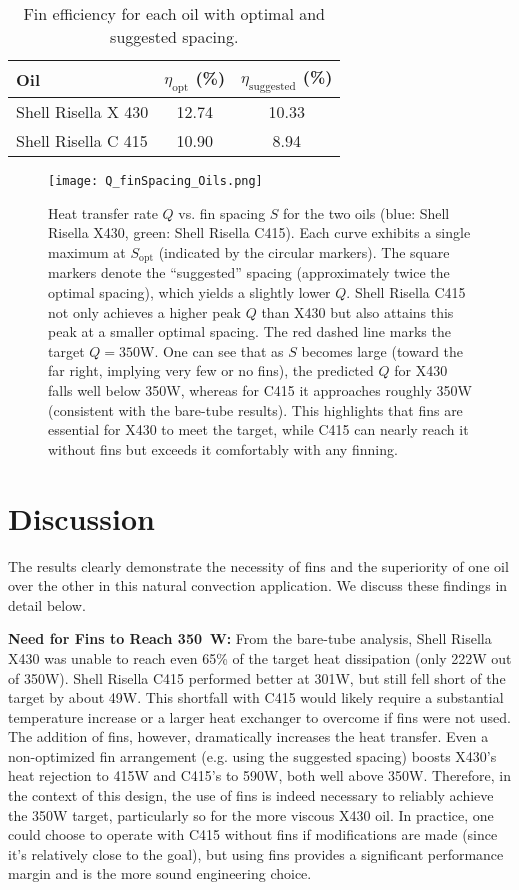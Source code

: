 \documentclass[12pt]{article}
\begin{document}
\begin{table}[h!]
\centering
\caption{Fin efficiency for each oil with optimal and suggested spacing.}
\label{tab:eta}
\begin{tabular}{lcc}
\toprule
Oil & $\eta_{\text{opt}}$ (\%) & $\eta_{\text{suggested}}$ (\%) \\
\midrule
Shell Risella X 430 & 12.74 & 10.33 \\
Shell Risella C 415 & 10.90 & 8.94 \\
\bottomrule
\end{tabular}
\end{table}
\begin{figure}[h!]    \centering
    \texttt{[image: Q\_finSpacing\_Oils.png]}
\caption{Heat transfer rate $Q$ vs. fin spacing $S$ for the two oils (blue: Shell Risella X430, green: Shell Risella C415). Each curve exhibits a single maximum at $S_{\text{opt}}$ (indicated by the circular markers). The square markers denote the “suggested” spacing (approximately twice the optimal spacing), which yields a slightly lower $Q$. Shell Risella C415 not only achieves a higher peak $Q$ than X430 but also attains this peak at a smaller optimal spacing. The red dashed line marks the target $Q=350$W. One can see that as $S$ becomes large (toward the far right, implying very few or no fins), the predicted $Q$ for X430 falls well below 350W, whereas for C415 it approaches roughly 350W (consistent with the bare-tube results). This highlights that fins are essential for X430 to meet the target, while C415 can nearly reach it without fins but exceeds it comfortably with any finning.}
\label{fig:heat_transfer}
\end{figure}

\section{Discussion}
The results clearly demonstrate the necessity of fins and the superiority of one oil over the other in this natural convection application. We discuss these findings in detail below.

\textbf{Need for Fins to Reach 350~W:} From the bare-tube analysis, Shell Risella X430 was unable to reach even 65\% of the target heat dissipation (only 222W out of 350W). Shell Risella C415 performed better at 301W, but still fell short of the target by about 49W. This shortfall with C415 would likely require a substantial temperature increase or a larger heat exchanger to overcome if fins were not used. The addition of fins, however, dramatically increases the heat transfer. Even a non-optimized fin arrangement (e.g. using the suggested spacing) boosts X430’s heat rejection to 415W and C415’s to 590W, both well above 350W. Therefore, in the context of this design, the use of fins is indeed necessary to reliably achieve the 350W target, particularly so for the more viscous X430 oil. In practice, one could choose to operate with C415 without fins if modifications are made (since it’s relatively close to the goal), but using fins provides a significant performance margin and is the more sound engineering choice.
\end{document}
